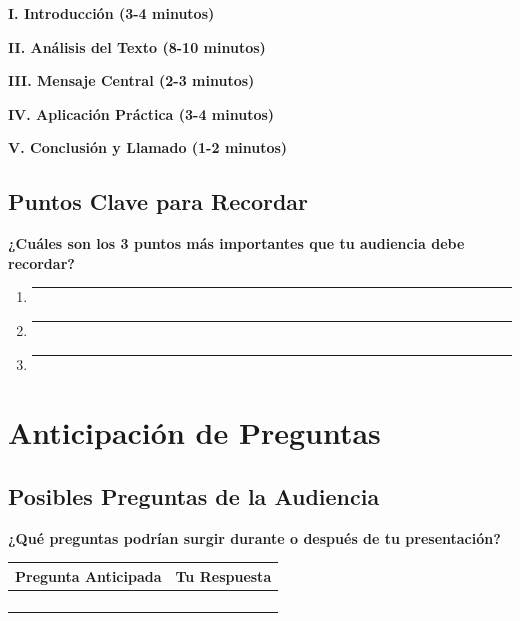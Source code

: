 \documentclass[11pt,a4paper]{article}
\begin{document}
\textbf{I. Introducción (3-4 minutos)}
\vspace{2cm}

\textbf{II. Análisis del Texto (8-10 minutos)}
\vspace{2cm}

\textbf{III. Mensaje Central (2-3 minutos)}
\vspace{2cm}

\textbf{IV. Aplicación Práctica (3-4 minutos)}
\vspace{2cm}

\textbf{V. Conclusión y Llamado (1-2 minutos)}
\vspace{2cm}

\subsection{Puntos Clave para Recordar}

\textbf{¿Cuáles son los 3 puntos más importantes que tu audiencia debe recordar?}

\begin{enumerate}[leftmargin=1cm]
    \item \rule{12cm}{0.4pt}
    \vspace{1cm}
    \item \rule{12cm}{0.4pt}
    \vspace{1cm}
    \item \rule{12cm}{0.4pt}
    \vspace{1cm}
\end{enumerate}

\newpage

\section{Anticipación de Preguntas}

\subsection{Posibles Preguntas de la Audiencia}

\textbf{¿Qué preguntas podrían surgir durante o después de tu presentación?}

\begin{tabularx}{\textwidth}{|X|X|}
\hline
\textbf{Pregunta Anticipada} & \textbf{Tu Respuesta} \\
\hline
& \\[2cm]
\hline
& \\[2cm]
\hline
& \\[2cm]
\hline
& \\[2cm]
\hline
\end{tabularx}
\end{document}
